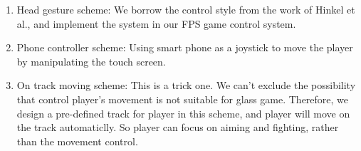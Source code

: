 \documentclass{sigchi}
\begin{document}
\begin{enumerate}
\item Head gesture scheme: We borrow the control style from the work of Hinkel et al.\cite{wheel}, and implement the system in our FPS game control system.

\item Phone controller scheme: Using smart phone as a joystick to move the player by manipulating the touch screen.

\item On track moving scheme: This is a trick one. We can't exclude the possibility that control player's movement is not suitable for glass game. Therefore, we design a pre-defined track for player in this scheme, and player will move on the track automaticlly. So player can focus on aiming and fighting, rather than the movement control.
\end{enumerate}


\end{document}

